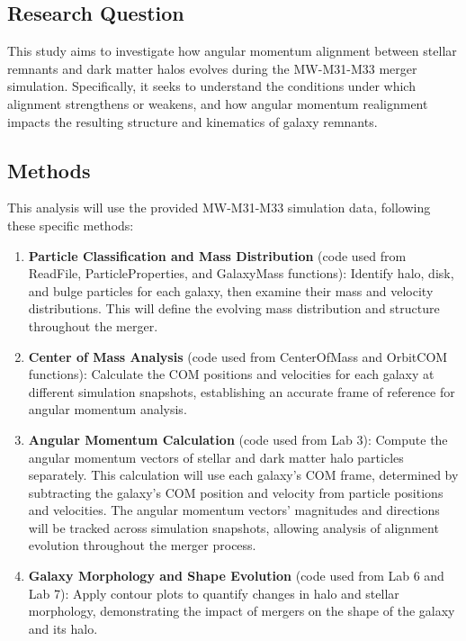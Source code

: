 \documentclass[twocolumn]{aastex631}
\begin{document}
\subsection{Research Question}
This study aims to investigate how angular momentum alignment between stellar remnants and dark matter halos evolves during the MW-M31-M33 merger simulation. Specifically, it seeks to understand the conditions under which alignment strengthens or weakens, and how angular momentum realignment impacts the resulting structure and kinematics of galaxy remnants.

\subsection{Methods}
This analysis will use the provided MW-M31-M33 simulation data, following these specific methods:

\begin{enumerate}
    \item \textbf{Particle Classification and Mass Distribution} (code used from ReadFile, ParticleProperties, and GalaxyMass functions): Identify halo, disk, and bulge particles for each galaxy, then examine their mass and velocity distributions. This will define the evolving mass distribution and structure throughout the merger.
    
    \item \textbf{Center of Mass Analysis} (code used from CenterOfMass and OrbitCOM functions): Calculate the COM positions and velocities for each galaxy at different simulation snapshots, establishing an accurate frame of reference for angular momentum analysis.

    \item \textbf{Angular Momentum Calculation} (code used from Lab 3): Compute the angular momentum vectors of stellar and dark matter halo particles separately. This calculation will use each galaxy’s COM frame, determined by subtracting the galaxy’s COM position and velocity from particle positions and velocities. The angular momentum vectors' magnitudes and directions will be tracked across simulation snapshots, allowing analysis of alignment evolution throughout the merger process.

    \item \textbf{Galaxy Morphology and Shape Evolution} (code used from Lab 6 and Lab 7): Apply contour plots to quantify changes in halo and stellar morphology, demonstrating the impact of mergers on the shape of the galaxy and its halo.
\end{enumerate}
\end{document}
